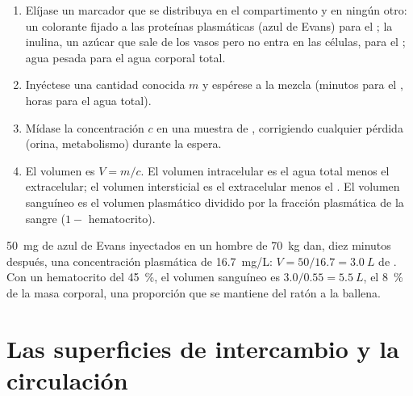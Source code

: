 \begin{method}\label{met:b1:mammal-organization:dilution}
\begin{enumerate}
  \item Elíjase un marcador que se distribuya en el compartimento y en
        ningún otro: un colorante fijado a las proteínas plasmáticas (azul
        de Evans) para el ; la inulina, un azúcar que sale de los
        vasos pero no entra en las células, para el ;
        agua pesada para el agua corporal total.
  \item Inyéctese una cantidad conocida $m$ y espérese a la mezcla
        (minutos para el , horas para el agua total).
  \item Mídase la concentración $c$ en una muestra de , corrigiendo
        cualquier pérdida (orina, metabolismo) durante la espera.
  \item El volumen es $V = m/c$. El volumen intracelular es el agua total
        menos el extracelular; el volumen intersticial es el extracelular
        menos el . El volumen sanguíneo es el volumen plasmático
        dividido por la fracción plasmática de la sangre
        ($1 - $ hematocrito).
\end{enumerate}
\end{method}

\begin{example}\label{ex:b1:mammal-organization:evansblue}
\qty{50}{mg} de azul de Evans inyectados en un hombre de \qty{70}{kg} dan,
diez minutos después, una concentración plasmática de \qty{16.7}{mg/L}:
$V = 50/16.7 = \qty{3.0}{L}$ de . Con un hematocrito del
\qty{45}{\%}, el volumen sanguíneo es $3.0/0.55 = \qty{5.5}{L}$, el
\qty{8}{\%} de la masa corporal, una proporción que se mantiene del ratón a
la ballena.
\end{example}

\section{Las superficies de intercambio y la circulación}

